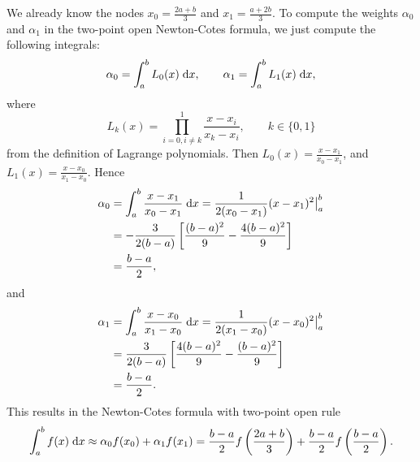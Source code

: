 \documentclass{homework}
\begin{document}
	\maketitle
	
	\question 
	We already know the nodes $x_0 = \frac{2a+ b}{3}$ and $x_1 = \frac{a+2b}{3}$. To compute the weights $\alpha_0$ and $\alpha_1$ in the two-point open Newton-Cotes formula, we just compute the following integrals:
	\begin{equation}
		\alpha_0 = \int_a^b L_0(x)\;\text{d} x, \qquad \alpha_1 = \int_a^b L_1(x)\;\text{d} x,
	\end{equation}
	where
	\begin{equation}
		L_k(x) = \prod_{i=0, i\ne k}^1 \frac{x-x_i}{x_k - x_i}, \qquad k\in\{0,1\}
	\end{equation}
	from the definition of Lagrange polynomials. Then $L_0(x) = \frac{x-x_1}{x_0-x_1}$, and $L_1(x) = \frac{x-x_0}{x_1-x_0}$. Hence
	\begin{align}
		\alpha_0 &= \int_a^b \frac{x-x_1}{x_0-x_1}\;\text{d} x = \frac{1}{2(x_0-x_1)}(x-x_1)^2\big\vert_a^b\\
		&= -\frac{3}{2(b-a)}\left[\frac{(b-a)^2}{9} - \frac{4(b-a)^2}{9}\right] \\
		&= \frac{b-a}{2},
	\end{align}
	and
	\begin{align}
		\alpha_1 &= \int_a^b \frac{x-x_0}{x_1-x_0}\;\text{d} x = \frac{1}{2(x_1-x_0)}(x-x_0)^2\big\vert_a^b \\
		&= \frac{3}{2(b-a)}\left[\frac{4(b-a)^2}{9} - \frac{(b-a)^2}{9}\right] \\
		&= \frac{b-a}{2}.
	\end{align}
	This results in the Newton-Cotes formula with two-point open rule
	\begin{equation}
		\int_a^bf(x)\;\text{d} x \approx \alpha_0f(x_0) + \alpha_1f(x_1) = \frac{b-a}{2}f\left(\frac{2a+b}{3}\right) + \frac{b-a}{2}f\left(\frac{b-a}{2}\right).
	\end{equation}
	
\end{document}
